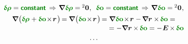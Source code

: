 \begin{equation*}
\begin{array}{c}
%
\constvarvector{\hspace{-0.1ex}\bm{\rho}} = \boldconstant
\hspace{.4ex} \Rightarrow \hspace{.2ex}
\boldnabla \hspace{.1ex} \constvarvector{\hspace{-0.1ex}\bm{\rho}} =  \hspace{-0.12ex} \zerobivalent \hspace{.1ex} ,
\;\:
\constvarvector{o} = \boldconstant
\hspace{.4ex} \Rightarrow \hspace{.2ex}
\boldnabla \hspace{.1ex} \constvarvector{o} = \hspace{-0.12ex} \zerobivalent \hspace{.1ex} ,
\\[.4em]
%
\boldnabla \hspace{.1ex} \bigl(
\constvarvector{\hspace{-0.1ex}\bm{\rho}} \hspace{.1ex} +
\constvarvector{o} \hspace{-0.33ex} \times \hspace{-0.33ex} \currentlocationvector \hspace{.2ex} \bigr) \hspace{-0.25ex}
= \hspace{-0.1ex} \boldnabla \hspace{.1ex} \bigl(
\constvarvector{o} \hspace{-0.33ex} \times \hspace{-0.33ex} \currentlocationvector \hspace{.2ex} \bigr) \hspace{-0.25ex}
= \boldnabla \hspace{.1ex} \constvarvector{o} \hspace{-0.33ex} \times \hspace{-0.33ex} \currentlocationvector
\hspace{.1ex} - \hspace{-0.2ex}
\boldnabla \currentlocationvector \times \hspace{-0.2ex} \constvarvector{o} =
\\[.1em] %
\hspace*{\fill}
= - \boldnabla \currentlocationvector \hspace{-0.1ex} \times \hspace{-0.2ex} \constvarvector{o}
= - \hspace{.1ex} \UnitDyad \hspace{-0.16ex} \times \hspace{-0.2ex} \constvarvector{o}
\\[.4em]
%
\cdots
\end{array}
\end{equation*}

